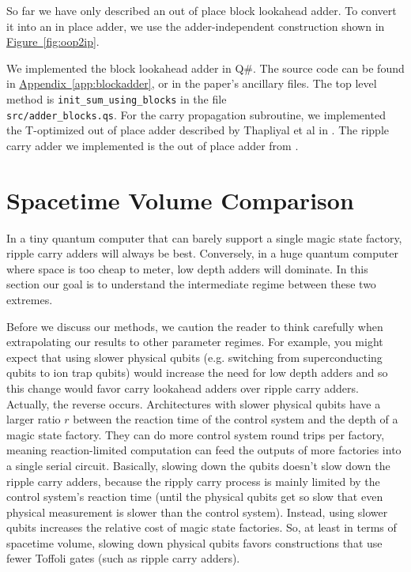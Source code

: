 \documentclass[onecolumn,unpublished]{quantumarticle}
\theoremstyle{definition}
\theoremstyle{definition}
\theoremstyle{definition}
\DeclareRobustCommand{\app}[1]{\hyperref[app:#1]{Appendix~\ref*{app:#1}}}
\newcommand{\fig}[1]{\hyperref[fig:#1]{Figure~\ref*{fig:#1}}}
\begin{document}
So far we have only described an out of place block lookahead adder.
To convert it into an in place adder, we use the adder-independent construction shown in \fig{oop2ip}.

We implemented the block lookahead adder in Q\#.
The source code can be found in \app{blockadder}, or in the paper's ancillary files.
The top level method is \texttt{init\_sum\_using\_blocks} in the file \\\texttt{src/adder\_blocks.qs}.
For the carry propagation subroutine, we implemented the T-optimized out of place adder described by Thapliyal et al in \cite{thapliyal2020lookahead}.
The ripple carry adder we implemented is the out of place adder from \cite{gidney2018halving}.


\section{Spacetime Volume Comparison}
\label{sec:estimate}

In a tiny quantum computer that can barely support a single magic state factory, ripple carry adders will always be best.
Conversely, in a huge quantum computer where space is too cheap to meter, low depth adders will dominate.
In this section our goal is to understand the intermediate regime between these two extremes.

Before we discuss our methods, we caution the reader to think carefully when extrapolating our results to other parameter regimes.
For example, you might expect that using slower physical qubits (e.g. switching from superconducting qubits to ion trap qubits) would increase the need for low depth adders and so this change would favor carry lookahead adders over ripple carry adders.
Actually, the reverse occurs.
Architectures with slower physical qubits have a larger ratio $r$ between the reaction time of the control system and the depth of a magic state factory.
They can do more control system round trips per factory, meaning reaction-limited computation can feed the outputs of more factories into a single serial circuit.
Basically, slowing down the qubits doesn't slow down the ripple carry adders, because the ripply carry process is mainly limited by the control system's reaction time (until the physical qubits get so slow that even physical measurement is slower than the control system).
Instead, using slower qubits increases the relative cost of magic state factories.
So, at least in terms of spacetime volume, slowing down physical qubits favors constructions that use fewer Toffoli gates (such as ripple carry adders).
\end{document}

